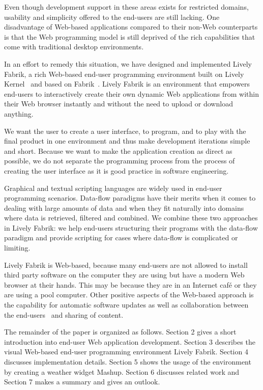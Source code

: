 \documentclass[pdftex, times, 10pt, twocolumn]{article}
\begin{document}
Even though development support in these areas exists for restricted domains, usability and simplicity offered to the end-users are still lacking. One disadvantage of Web-based applications compared to their non-Web counterparts is that the Web programming model is still deprived of the rich capabilities that come with traditional desktop environments. 

In an effort to remedy this situation, we have designed and implemented Lively Fabrik, a rich Web-based end-user programming environment built on Lively Kernel~\cite{Ingalls2007SLL} and based on Fabrik~\cite{Ingalls1988FVP}. Lively Fabrik is an environment that empowers end-users to interactively create their own dynamic Web applications from within their Web browser instantly and without the need to upload or download anything. 

We want the user to create a user interface, to program, and to play with the final product in one environment and thus make development iterations simple and short. Because we want to make the application creation as direct as possible, we do not separate the programming process from the process of creating the user interface as it is good practice in software engineering. 

Graphical and textual scripting languages are widely used in end-user programming scenarios. Data-flow paradigms have their merits when it comes to dealing with large amounts of data and when they fit naturally into domains where data is retrieved, filtered and combined. We combine these two approaches in Lively Fabrik: we help end-users structuring their programs with the data-flow paradigm and provide scripting for cases where data-flow is complicated or limiting.  

Lively Fabrik is Web-based, because many end-users are not allowed to install third party software on the computer they are using but have a modern Web browser at their hands. This may be because they are in an Internet café or they are using a pool computer. Other positive aspects of the Web-based approach is the capability for automatic software updates as well as collaboration between the end-users~\cite{Ohshima2007TLW} and sharing of content.  

The remainder of the paper is organized as follows. Section 2 gives a short introduction into end-user Web application development. Section 3 describes the visual Web-based end-user programming environment Lively Fabrik. Section 4 discusses implementation details. Section 5 shows the usage of the environment by creating a weather widget Mashup. Section 6 discusses related work and Section 7 makes a summary and gives an outlook. 
\end{document}
